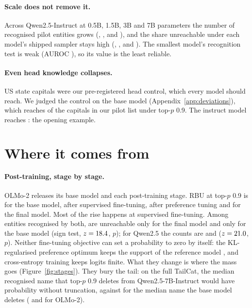 \documentclass[11pt]{article}
\begin{document}
\paragraph{Scale does not remove it.} Across Qwen2.5-Instruct at 0.5B, 1.5B, 3B and 7B parameters the number of recognised pilot entities grows (\scRecognisedHalf{}, \scRecognisedOneHalf{}, \scRecognisedThree{} and \gzQwenInstRecognised{}), and the share unreachable under each model's shipped sampler stays high (\scShippedHalf{}, \scShippedOneHalf{}, \scShippedThree{} and \gzQwenInstShipped{}). The smallest model's recognition test is weak (AUROC \scAurocHalf{}), so its value is the least reliable.

\paragraph{Even head knowledge collapses.} US state capitals were our pre-registered head control, which every model should reach. We judged the control on the base model (Appendix~\ref{app:deviations}), which reaches \gzCapitalsReachBase{} of the \gzCapitalsMembers{} capitals in our pilot list under top-$p$ 0.9. The instruct model reaches \gzCapitalsReachInst{}: the opening example.

\section{Where it comes from}\label{sec:where}

\paragraph{Post-training, stage by stage.} OLMo-2 \citep{olmo2024olmo2} releases its base model and each post-training stage. RBU at top-$p$ 0.9 is \goRbuOlmoBase{} for the base model, \goRbuOlmoSft{} after supervised fine-tuning, \goRbuOlmoDpo{} after preference tuning and \goRbuOlmoInst{} for the final model. Most of the rise happens at supervised fine-tuning. Among entities recognised by both, \goPairedInstOnly{} are unreachable only for the final model and \goPairedBaseOnly{} only for the base model (sign test, $z=18.4$, $p$\goPairedPOlmo{}); for Qwen2.5 the counts are \gzPairedInstOnly{} and \gzPairedBaseOnly{} ($z=21.0$, $p$\goPairedPQwen{}). Neither fine-tuning objective can set a probability to zero by itself: the KL-regularised preference optimum keeps the support of the reference model \citep{rafailov2023dpo}, and cross-entropy training keeps logits finite. What they change is where the mass goes (Figure~\ref{fig:stages}). They bury the tail: on the full TailCat, the median recognised name that top-$p$ 0.9 deletes from Qwen2.5-7B-Instruct would have probability \ztMedQQI{} without truncation, against \ztMedQQB{} for the median name the base model deletes (\ztMedQOI{} and \ztMedQOB{} for OLMo-2).
\end{document}

